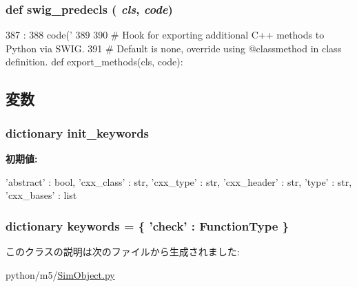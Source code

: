 \hypertarget{classm5_1_1SimObject_1_1MetaSimObject_ab3dbcf5716623eac67a8ccc074fa7e13}{
\subsubsection[{swig\_\-predecls}]{\setlength{\rightskip}{0pt plus 5cm}def swig\_\-predecls ( {\em cls}, \/   {\em code})}}
\label{classm5_1_1SimObject_1_1MetaSimObject_ab3dbcf5716623eac67a8ccc074fa7e13}



\begin{DoxyCode}
387                                 :
388         code('%
389 
390     # Hook for exporting additional C++ methods to Python via SWIG.
391     # Default is none, override using @classmethod in class definition.
    def export_methods(cls, code):
\end{DoxyCode}


\subsection{変数}
\hypertarget{classm5_1_1SimObject_1_1MetaSimObject_a608ecb4a2947d6894ab9594d7f59f0a8}{
\subsubsection[{init\_\-keywords}]{\setlength{\rightskip}{0pt plus 5cm}dictionary {\bf init\_\-keywords}}}
\label{classm5_1_1SimObject_1_1MetaSimObject_a608ecb4a2947d6894ab9594d7f59f0a8}
{\bfseries 初期値:}
\begin{DoxyCode}
{ 'abstract' : bool,
                      'cxx_class' : str,
                      'cxx_type' : str,
                      'cxx_header' : str,
                      'type' : str,
                      'cxx_bases' : list }
\end{DoxyCode}
\hypertarget{classm5_1_1SimObject_1_1MetaSimObject_a834325b701200b492fc4d7422529cc70}{
\subsubsection[{keywords}]{\setlength{\rightskip}{0pt plus 5cm}dictionary {\bf keywords} = \{ 'check' : FunctionType \}}}
\label{classm5_1_1SimObject_1_1MetaSimObject_a834325b701200b492fc4d7422529cc70}


このクラスの説明は次のファイルから生成されました:\begin{DoxyCompactItemize}
\item 
python/m5/\hyperlink{SimObject_8py}{SimObject.py}\end{DoxyCompactItemize}
